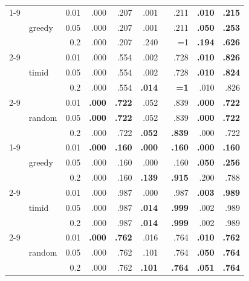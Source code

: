 \documentclass{article}
\begin{document}
\begin{table}[h]
\begin{tabular}{l@{\hskip 12pt} l@{\hskip 12pt} r@{\hskip 12pt} rr@{\hskip 12pt} rr@{\hskip 12pt} rr@{\hskip 12pt}}
 \cmidrule(lr){1-9}
\multirow{9}{*}{drone} & \multirow{3}{*}{greedy} & 0.01 & .000 & .207 & .001 & .211 & \textbf{.010} & \textbf{.215} \\
 &  & 0.05 & .000 & .207 & .001 & .211 & \textbf{.050} & \textbf{.253} \\
 &  & 0.2 & .000 & .207 & \cellcolor{red!20}.240 & \cellcolor{red!20}~~{=}1 & \textbf{.194} & \textbf{.626} \\
 \cmidrule(lr){2-9}
 & \multirow{3}{*}{timid} & 0.01 & .000 & .554 & .002 & .728 & \textbf{.010} & \textbf{.826} \\
 &  & 0.05 & .000 & .554 & .002 & .728 & \textbf{.010} & \textbf{.824} \\
 &  & 0.2 & .000 & .554 & \textbf{.014} & \textbf{~~{=}1} & .010 & .826 \\
 \cmidrule(lr){2-9}
 & \multirow{3}{*}{random} & 0.01 & \textbf{.000} & \textbf{.722} & \cellcolor{red!20}.052 & \cellcolor{red!20}.839 & \textbf{.000} & \textbf{.722} \\
 &  & 0.05 & \textbf{.000} & \textbf{.722} & \cellcolor{red!20}.052 & \cellcolor{red!20}.839 & \textbf{.000} & \textbf{.722} \\
 &  & 0.2 & .000 & .722 & \textbf{.052} & \textbf{.839} & .000 & .722 \\
 \cmidrule(lr){1-9}
\multirow{9}{*}{drone-b} & \multirow{3}{*}{greedy} & 0.01 & \textbf{.000} & \textbf{.160} & \textbf{.000} & \textbf{.160} & \textbf{.000} & \textbf{.160} \\
 &  & 0.05 & .000 & .160 & .000 & .160 & \textbf{.050} & \textbf{.256} \\
 &  & 0.2 & .000 & .160 & \textbf{.139} & \textbf{.915} & .200 & .788 \\
 \cmidrule(lr){2-9}
 & \multirow{3}{*}{timid} & 0.01 & .000 & .987 & .000 & .987 & \textbf{.003} & \textbf{.989} \\
 &  & 0.05 & .000 & .987 & \textbf{.014} & \textbf{.999} & .002 & .989 \\
 &  & 0.2 & .000 & .987 & \textbf{.014} & \textbf{.999} & .002 & .989 \\
 \cmidrule(lr){2-9}
 & \multirow{3}{*}{random} & 0.01 & \textbf{.000} & \textbf{.762} & \cellcolor{red!20}.016 & \cellcolor{red!20}.764 & \textbf{.010} & \textbf{.762} \\
 &  & 0.05 & .000 & .762 & \cellcolor{red!20}.101 & \cellcolor{red!20}.764 & \textbf{.050} & \textbf{.764} \\
 &  & 0.2 & .000 & .762 & \textbf{.101} & \textbf{.764} & \textbf{.051} & \textbf{.764} \\

\bottomrule
\end{tabular}

\end{table}
\end{document}
